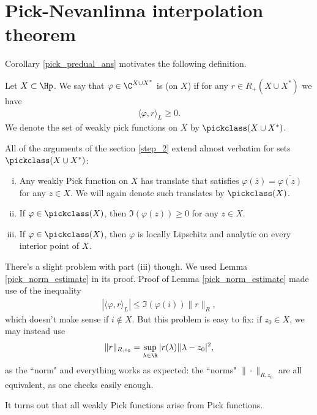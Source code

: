 \section{Pick-Nevanlinna interpolation theorem}

Corollary \ref{pick_predual_ans} motivates the following definition.

\begin{maar}
	Let $X \subset \Hp$. We say that $\varphi \in \C^{X \cup X^{*}}$ is  (on $X$) if for any $r \in R_{+}(X \cup X^{*})$ we have
	\begin{align*}
		\langle \varphi, r\rangle_{L} \geq 0.
	\end{align*}
	We denote the set of weakly pick functions on $X$ by $\pickclass(X \cup X^{*})$.
\end{maar}

All of the arguments of the section \ref{step_2} extend almost verbatim for sets $\pickclass(X \cup X^{*})$:
\begin{enumerate}[(i)]
	\item Any weakly Pick function on $X$ has translate that satisfies $\varphi(\overline{z}) = \overline{\varphi(z)}$ for any $z \in X$. We will again denote such translates by $\pickclass(X)$.
	\item If $\varphi \in \pickclass(X)$, then $\Im(\varphi(z)) \geq 0$ for any $z \in X$.
	\item If $\varphi \in \pickclass(X)$, then $\varphi$ is locally Lipschitz and analytic on every interior point of $X$.
\end{enumerate}

There's a slight problem with part (iii) though. We used Lemma \ref{pick_norm_estimate} in its proof. Proof of Lemma \ref{pick_norm_estimate} made use of the inequality
\begin{align*}
	\left|\langle \varphi, r \rangle_{L}\right| \leq \Im(\varphi(i)) \|r\|_{R},
\end{align*}
which doesn't make sense if $i \notin X$. But this problem is easy to fix: if $z_{0} \in X$, we may instead use
\begin{align*}
	\|r\|_{R, z_{0}} = \sup_{\lambda \in \R} |r(\lambda)| |\lambda - z_{0}|^2,
\end{align*}
as the  ``norm" and everything works as expected: the ``norms" $\|\cdot\|_{R, z_{0}}$ are all equivalent, as one checks easily enough.

It turns out that all weakly Pick functions arise from Pick functions.

